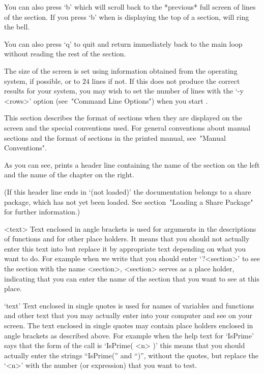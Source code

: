 You can also press `b' which will scroll back to the *previous* full screen
of lines of the section.
If you press `b' when {\GAP} is displaying the top of a section,
{\GAP} will ring the bell.

You can also press `q' to quit and return immediately back to the main
{\GAP} loop without reading the rest of the section.

The size of the screen is set using information obtained from the
operating system, if possible, or to $24$ lines if not.
If this does not produce the correct results for your system,
you may wish to set the number of lines with the `-y <rows>' option
(see~"Command Line Options") when you start {\GAP}.



This section describes the format of sections when they are displayed on
the screen and the special conventions used.
For general conventions about manual sections and the format of sections
in the printed manual, see~"Manual Conventions".

As you can see, {\GAP} prints a header line
containing the name of the section on the left and the name of the
chapter on the right.

(If this header line ends in `(not loaded)' the documentation belongs to a
share package, which has not yet been loaded. See section~"Loading a Share
Package" for further information.)

\begintt
<text>
\endtt
Text enclosed in angle brackets is used for arguments in the descriptions
of functions and for other place holders. It means that you should not
actually enter this text into {\GAP} but replace it by appropriate
text depending on what you want to do. For example when we write that
you should enter `?<section>' to see the section with the name <section>,
<section> serves as a place holder, indicating that you can enter the
name of the section that you want to see at this place.

\begintt
`text'
\endtt
Text enclosed in single quotes is used for names of variables and
functions and other text that you may actually enter into your computer
and see on your screen. The text enclosed in single quotes may contain
place holders enclosed in angle brackets as described above. For example
when the help text for `IsPrime' says that the form of the call is
`IsPrime( <n> )' this means that you should actually
enter the strings ``IsPrime('' and ``)'', without the quotes,
but replace the `<n>' with the number (or expression)
that you want to test.

